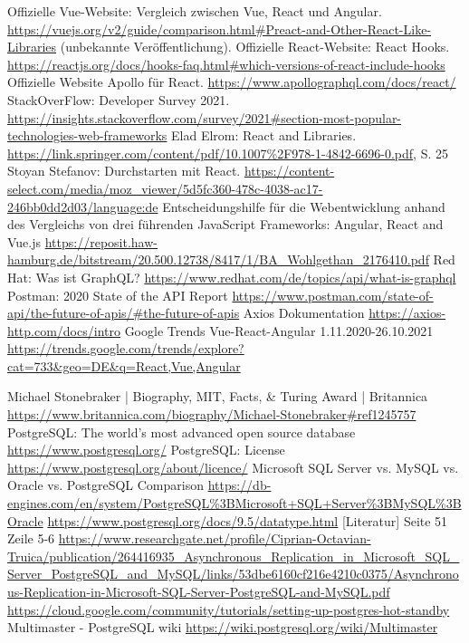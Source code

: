 \begin{thebibliography}{HR08}
   Offizielle Vue-Website: Vergleich zwischen Vue, React und Angular. \url{https://vuejs.org/v2/guide/comparison.html#Preact-and-Other-React-Like-Libraries} (unbekannte Veröffentlichung).
  Offizielle React-Website: React Hooks. \url{https://reactjs.org/docs/hooks-faq.html#which-versions-of-react-include-hooks}
  Offizielle Website Apollo für React. \url{https://www.apollographql.com/docs/react/}
  StackOverFlow: Developer Survey 2021. \url{https://insights.stackoverflow.com/survey/2021#section-most-popular-technologies-web-frameworks}
  Elad Elrom: React and Libraries. \url{https://link.springer.com/content/pdf/10.1007%2F978-1-4842-6696-0.pdf}, S. 25
  Stoyan Stefanov: Durchstarten mit React. \url{https://content-select.com/media/moz_viewer/5d5fc360-478c-4038-ac17-246bb0dd2d03/language:de}
  Entscheidungshilfe für die Webentwicklung anhand des Vergleichs von drei führenden JavaScript Frameworks: Angular, React and Vue.js \url{https://reposit.haw-hamburg.de/bitstream/20.500.12738/8417/1/BA_Wohlgethan_2176410.pdf}
  Red Hat: Was ist GraphQL? \url{https://www.redhat.com/de/topics/api/what-is-graphql}
  Postman: 2020 State of the API Report \url{https://www.postman.com/state-of-api/the-future-of-apis/#the-future-of-apis}
  Axios Dokumentation \url{https://axios-http.com/docs/intro}
  Google Trends Vue-React-Angular 1.11.2020-26.10.2021 \url{https://trends.google.com/trends/explore?cat=733&geo=DE&q=React,Vue,Angular}


   Michael Stonebraker | Biography, MIT, Facts, \& Turing Award | Britannica \url{https://www.britannica.com/biography/Michael-Stonebraker#ref1245757}
   PostgreSQL: The world's most advanced open source database \url{https://www.postgresql.org/}
   PostgreSQL: License \url{https://www.postgresql.org/about/licence/}
   Microsoft SQL Server vs. MySQL vs. Oracle vs. PostgreSQL Comparison \url{https://db-engines.com/en/system/PostgreSQL%3BMicrosoft+SQL+Server%3BMySQL%3BOracle}
   \url{https://www.postgresql.org/docs/9.5/datatype.html}
   [Literatur] Seite 51 Zeile 5-6 \url{https://www.researchgate.net/profile/Ciprian-Octavian-Truica/publication/264416935_Asynchronous_Replication_in_Microsoft_SQL_Server_PostgreSQL_and_MySQL/links/53dbe6160cf216e4210c0375/Asynchronous-Replication-in-Microsoft-SQL-Server-PostgreSQL-and-MySQL.pdf}
   \url{https://cloud.google.com/community/tutorials/setting-up-postgres-hot-standby}
   Multimaster - PostgreSQL wiki \url{https://wiki.postgresql.org/wiki/Multimaster}


\end{thebibliography}
